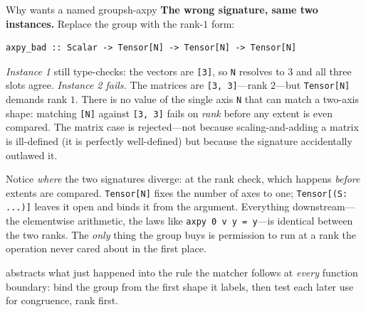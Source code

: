 \begin{workedexample}{Why  wants a named group}{sh-axpy}
\textbf{The wrong signature, same two instances.} Replace the group with the
rank-$1$ form:
\begin{lstlisting}[style=l4style]
axpy_bad :: Scalar -> Tensor[N] -> Tensor[N] -> Tensor[N]
\end{lstlisting}
\emph{Instance 1} still type-checks: the vectors are
\lstinline[style=l4style]|[3]|, so \texttt{N} resolves to $3$ and all three
slots agree. \emph{Instance 2 fails.} The matrices are
\lstinline[style=l4style]|[3, 3]|---rank $2$---but
\lstinline[style=l4style]|Tensor[N]| demands rank $1$. There is no value of
the single axis \texttt{N} that can match a two-axis shape: matching
\lstinline[style=l4style]|[N]| against \lstinline[style=l4style]|[3, 3]|
fails on \emph{rank} before any extent is even compared. The matrix case is
rejected---not because scaling-and-adding a matrix is ill-defined (it is
perfectly well-defined) but because the signature accidentally outlawed it.
\end{workedexample}

\begin{remark}
Notice \emph{where} the two signatures diverge: at the rank check, which
happens \emph{before} extents are compared. \lstinline[style=l4style]|Tensor[N]|
fixes the number of axes to one; \lstinline[style=l4style]|Tensor[(S: ...)]|
leaves it open and binds it from the argument. Everything downstream---the
elementwise arithmetic, the laws like
\lstinline[style=l4style]|axpy 0 v y = y|---is identical between the two ranks.
The \emph{only} thing the group buys is permission to run at a rank the
operation never cared about in the first place.
\end{remark}

 abstracts what just happened into the rule the matcher
follows at \emph{every} function boundary: bind the group from the first
shape it labels, then test each later use for congruence, rank first.

